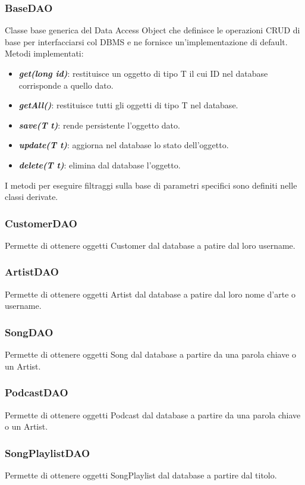 \documentclass{article}
\begin{document}
  \subsubsection{BaseDAO}
  Classe base generica del Data Access Object che definisce le operazioni CRUD di base per interfacciarsi col DBMS e ne fornisce un'implementazione di default.
  Metodi implementati:
  \begin{itemize}
    \item \textbf{\textit{get(long id)}}: restituisce un oggetto di tipo T il cui ID nel database corrisponde a quello dato.
    \item \textbf{\textit{getAll()}}: restituisce tutti gli oggetti di tipo T nel database.
    \item \textbf{\textit{save(T t)}}: rende persistente l'oggetto dato.
    \item \textbf{\textit{update(T t)}}: aggiorna nel database lo stato dell'oggetto.
    \item \textbf{\textit{delete(T t)}}: elimina dal database l'oggetto.
  \end{itemize}
  I metodi per eseguire filtraggi sulla base di parametri specifici sono definiti nelle classi derivate.

  \subsubsection{CustomerDAO}
  Permette di ottenere oggetti Customer dal database a patire dal loro username.

  \subsubsection{ArtistDAO}
  Permette di ottenere oggetti Artist dal database a patire dal loro nome d'arte o username.

  \subsubsection{SongDAO}
  Permette di ottenere oggetti Song dal database a partire da una parola chiave o un Artist.

  \subsubsection{PodcastDAO}
  Permette di ottenere oggetti Podcast dal database a partire da una parola chiave o un Artist.

  \subsubsection{SongPlaylistDAO}
  Permette di ottenere oggetti SongPlaylist dal database a partire dal titolo.
\end{document}
